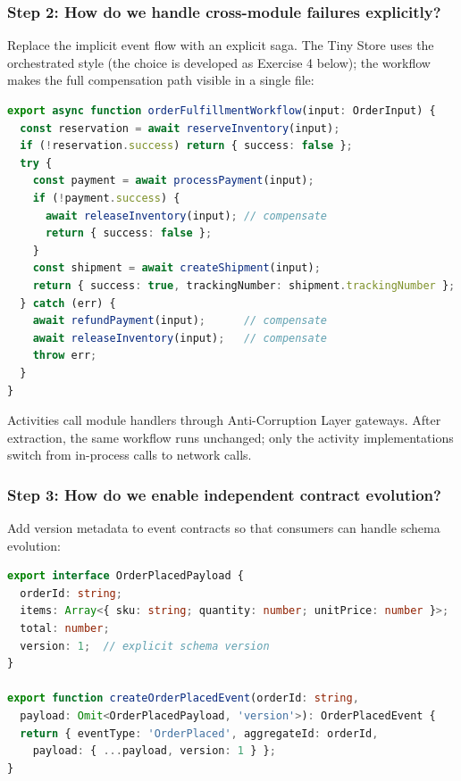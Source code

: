 \subsubsection*{Step 2: How do we handle cross-module failures explicitly?}

Replace the implicit event flow with an explicit saga. The Tiny Store uses the orchestrated style (the choice is developed as Exercise 4 below); the workflow makes the full compensation path visible in a single file:

\begin{lstlisting}[basicstyle=\ttfamily\scriptsize,language=TypeScript,caption={Order fulfillment saga with compensating actions},label={lst:g4-temporal-workflow}]
export async function orderFulfillmentWorkflow(input: OrderInput) {
  const reservation = await reserveInventory(input);
  if (!reservation.success) return { success: false };
  try {
    const payment = await processPayment(input);
    if (!payment.success) {
      await releaseInventory(input); // compensate
      return { success: false };
    }
    const shipment = await createShipment(input);
    return { success: true, trackingNumber: shipment.trackingNumber };
  } catch (err) {
    await refundPayment(input);      // compensate
    await releaseInventory(input);   // compensate
    throw err;
  }
}
\end{lstlisting}

\noindent
Activities call module handlers through Anti-Corruption Layer gateways. After extraction, the same workflow runs unchanged; only the activity implementations switch from in-process calls to network calls.

\subsubsection*{Step 3: How do we enable independent contract evolution?}

Add version metadata to event contracts so that consumers can handle schema evolution:

\begin{lstlisting}[basicstyle=\ttfamily\scriptsize,language=TypeScript,caption={Versioned event contract with factory},label={lst:g4-versioned-event}]
export interface OrderPlacedPayload {
  orderId: string;
  items: Array<{ sku: string; quantity: number; unitPrice: number }>;
  total: number;
  version: 1;  // explicit schema version
}

export function createOrderPlacedEvent(orderId: string,
  payload: Omit<OrderPlacedPayload, 'version'>): OrderPlacedEvent {
  return { eventType: 'OrderPlaced', aggregateId: orderId,
    payload: { ...payload, version: 1 } };
}
\end{lstlisting}

